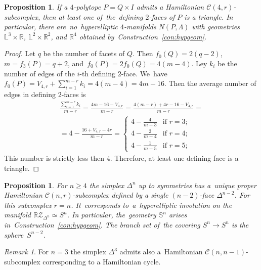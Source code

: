 \documentclass[12pt]{amsart}
\newtheorem{proposition}[formula]{Proposition}
\theoremstyle{definition}
\theoremstyle{remark}
\newtheorem{remark}[formula]{Remark}
\begin{document}
\begin{proposition}\label{prop:IX}
If a $4$-polytope $P=Q\times I$ admits a Hamiltonian \linebreak $\mathcal{C}(4,r)$-subcomplex, then 
at least one of~the~defining $2$-faces of $P$ is a triangle. In particular, there  are~no~hyperelliptic 
$4$-manifolds $N(P,\Lambda)$ with geometries $\mathbb L^3\times\mathbb R$, $\mathbb L^2\times\mathbb R^2$,
and $\mathbb R ^4$ obtained by~Construction~\ref{con:hypgeom}.
\end{proposition}
\begin{proof}
Let $q$ be the number of facets of $Q$. Then $f_0(Q)=2(q-2)$, $m=f_3(P)=q+2$, and~$f_0(P)=2f_0(Q)=4(m-4)$.
Ley $k_i$ be the number of edges of the $i$-th defining $2$-face. 
We~have $f_0(P)=V_{4,r}+\sum_{i=1}^{m-r}k_i=4(m-4)=4m-16$.
Then the average number of edges in defining $2$-faces is
\begin{gather*}
\frac{\sum\limits_{i=1}^{m-r}k_i}{m-r}=\frac{4m-16-V_{4,r}}{m-r}=\frac{4(m-r)+4r-16-V_{4,r}}{m-r}=\\
=4-\frac{16+V_{4,r}-4r}{m-r}=
\begin{cases}
4-\frac{4}{m-3}& \text{if } r=3;\\
4-\frac{2}{m-4}& \text{if } r=4;\\
4-\frac{1}{m-5}& \text{if } r=5;
\end{cases}
\end{gather*}
This number is strictly less then $4$. Therefore, at least one defining face is a triangle.
\end{proof}
\begin{proposition}\label{prop:Sn}
For $n\geqslant 4$ the simplex $\Delta^n$ up to symmetries has a~unique proper Hamiltonian $\mathcal{C}(n,r)$-subcomplex
defined by a single $(n-2)$-face $\Delta^{n-2}$. For this subcomplex $r=n$. It~corresponds
to~a~hyperelliptic involution on the manifold $\mathbb{R}\mathcal{Z}_{\Delta^n}\simeq S^n$.  
In particular, the~geometry $\mathbb S^n$ arises in~Construction~\ref{con:hypgeom}. The branch set of~the covering $S^n\to S^n$ is the sphere~$S^{n-2}$. 
\end{proposition}
\begin{remark}
For $n=3$ the simplex $\Delta^3$ admits also a~Hamiltonian $\mathcal{C}(n,n-1)$-subcomplex corresponding
to a Hamiltonian cycle. 
\end{remark}
\end{document}
